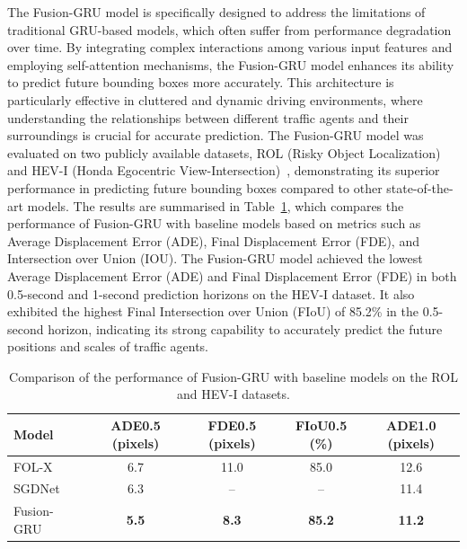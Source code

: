 \documentclass[12pt,oneside]{book} %
\begin{document}
\noindent The Fusion-GRU model is specifically designed to address the limitations of
traditional GRU-based models, which often suffer from performance degradation
over time. By integrating complex interactions among various input features and
employing self-attention mechanisms, the Fusion-GRU model enhances its ability
to predict future bounding boxes more accurately. This architecture is
particularly effective in cluttered and dynamic driving environments, where
understanding the relationships between different traffic agents and their
surroundings is crucial for accurate prediction. The Fusion-GRU model was
evaluated on two publicly available datasets, ROL (Risky Object Localization)~\cite{karim_am_net2023}
and HEV-I (Honda Egocentric View-Intersection)~\cite{yao2019egocentric, malla2019nemo}, demonstrating its superior
performance in predicting future bounding boxes compared to other
state-of-the-art models. The results are summarised in
Table~\ref{tab:fusion-gru-results}, which compares the performance of
Fusion-GRU with baseline models based on metrics such as Average Displacement
Error (ADE), Final Displacement Error (FDE), and Intersection over Union (IOU). The Fusion-GRU model achieved the lowest Average Displacement Error (ADE) and
Final Displacement Error (FDE) in both 0.5-second and 1-second prediction
horizons on the HEV-I dataset. It also exhibited the highest Final Intersection
over Union (FIoU) of 85.2\% in the 0.5-second horizon, indicating its strong
capability to accurately predict the future positions and scales of traffic
agents.

\begin{table}[H]
    \centering
    \caption{Comparison of the performance of Fusion-GRU with baseline models on the ROL and HEV-I datasets.}
    \begin{adjustbox}{max width=\textwidth}
        \begin{tabular}{lcccc}
            \toprule
            \textbf{Model}              & \textbf{ADE0.5 (pixels)} & \textbf{FDE0.5 (pixels)} & \textbf{FIoU0.5 (\%)} & \textbf{ADE1.0 (pixels)} \\ 
            \midrule
            FOL-X~\cite{FusionGRU}      & 6.7                      & 11.0                     & 85.0                  & 12.6                     \\
            SGDNet~\cite{FusionGRU}     & 6.3                      & --                       & --                    & 11.4                     \\
            Fusion-GRU~\cite{FusionGRU} & \textbf{5.5}             & \textbf{8.3}             & \textbf{85.2}         & \textbf{11.2}            \\
            \bottomrule
        \end{tabular}
    \end{adjustbox}
    \label{tab:fusion-gru-results}
\end{table}
\end{document}
